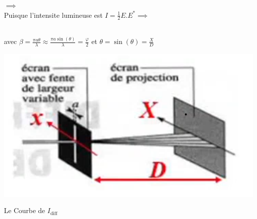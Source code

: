\documentclass[12pt]{book}
\begin{document}
                $\implies$ \\
                Puisque l'intensite lumineuse est $I = \frac{1}{2}E.E^{*} \implies $
                \begin{center}  
                    \begin{minipage}{0.6\linewidth}
                        \\
                        avec $\beta = \frac{\pi a \theta}{\lambda} \approx \frac{\pi a \sin(\theta)}{\lambda}=\frac{\varphi}{2}$ et $\theta = \sin(\theta)=\frac{X}{D}$
                    \end{minipage}
                    \begin{minipage}{0.39\linewidth}
                        \includegraphics[width=\linewidth]{pic/diffractionscheme.png}
                    \end{minipage}
                \end{center}
                Le Courbe de $I_{\text{diff}}$\\
\end{document}
